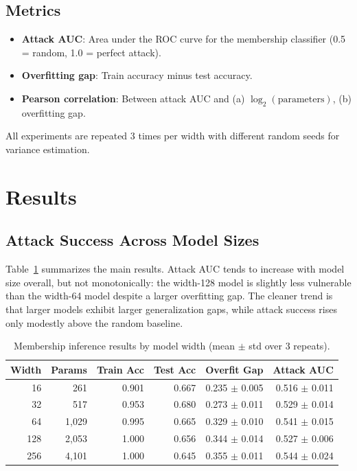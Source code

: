 \documentclass[11pt,a4paper]{article}
\begin{document}
\subsection{Metrics}

\begin{itemize}
  \item \textbf{Attack AUC}: Area under the ROC curve for the membership
    classifier (0.5 = random, 1.0 = perfect attack).
  \item \textbf{Overfitting gap}: Train accuracy minus test accuracy.
  \item \textbf{Pearson correlation}: Between attack AUC and (a)
    $\log_2(\text{parameters})$, (b) overfitting gap.
\end{itemize}

All experiments are repeated 3 times per width with different random
seeds for variance estimation.

\section{Results}

\subsection{Attack Success Across Model Sizes}

Table~\ref{tab:results} summarizes the main results. Attack AUC tends to
increase with model size overall, but not monotonically: the width-128
model is slightly less vulnerable than the width-64 model despite a larger
overfitting gap. The cleaner trend is that larger models exhibit larger
generalization gaps, while attack success rises only modestly above the
random baseline.

\begin{table}[h]
\centering
\caption{Membership inference results by model width (mean $\pm$ std over 3 repeats).}
\label{tab:results}
\begin{tabular}{@{}rrrrrr@{}}
\toprule
Width & Params & Train Acc & Test Acc & Overfit Gap & Attack AUC \\
\midrule
16  & 261   & 0.901 & 0.667 & 0.235 $\pm$ 0.005 & 0.516 $\pm$ 0.011 \\
32  & 517   & 0.953 & 0.680 & 0.273 $\pm$ 0.011 & 0.529 $\pm$ 0.014 \\
64  & 1,029 & 0.995 & 0.665 & 0.329 $\pm$ 0.010 & 0.541 $\pm$ 0.015 \\
128 & 2,053 & 1.000 & 0.656 & 0.344 $\pm$ 0.014 & 0.527 $\pm$ 0.006 \\
256 & 4,101 & 1.000 & 0.645 & 0.355 $\pm$ 0.011 & 0.544 $\pm$ 0.024 \\
\bottomrule
\end{tabular}
\end{table}
\end{document}
